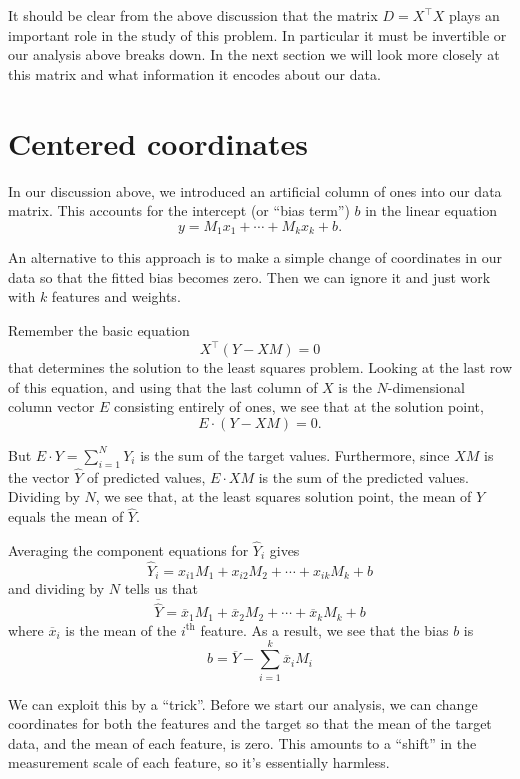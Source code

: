 \documentclass[
  11pt,
  letterpaper,
]{scrbook}
\theoremstyle{plain}
\theoremstyle{remark}
\begin{document}
It should be clear from the above discussion that the matrix
\(D=X^{\intercal}X\) plays an important role in the study of this
problem. In particular it must be invertible or our analysis above
breaks down. In the next section we will look more closely at this
matrix and what information it encodes about our data.

\hypertarget{sec-centered}{%
\section{Centered coordinates}\label{sec-centered}}

In our discussion above, we introduced an artificial column of ones into
our data matrix. This accounts for the intercept (or ``bias term'')
\(b\) in the linear equation \[
y = M_1 x_1 + \cdots + M_k x_k + b.
\]

An alternative to this approach is to make a simple change of
coordinates in our data so that the fitted bias becomes zero. Then we
can ignore it and just work with \(k\) features and weights.

Remember the basic equation \[
X^{\intercal}(Y-XM)=0
\] that determines the solution to the least squares problem. Looking at
the last row of this equation, and using that the last column of \(X\)
is the \(N\)-dimensional column vector \(E\) consisting entirely of
ones, we see that at the solution point, \[
E\cdot (Y-XM)=0.
\]

But \(E\cdot Y=\sum_{i=1}^{N} Y_{i}\) is the sum of the target values.
Furthermore, since \(XM\) is the vector \(\hat{Y}\) of predicted values,
\(E\cdot XM\) is the sum of the predicted values. Dividing by \(N\), we
see that, at the least squares solution point, the mean of \(Y\) equals
the mean of \(\hat{Y}\).

Averaging the component equations for \(\hat{Y}_i\) gives \[
\hat{Y}_{i} = x_{i1}M_1 + x_{i2}M_{2} + \cdots + x_{ik}M_k + b 
\] and dividing by \(N\) tells us that \[
\overline{\hat{Y}} = \overline{x}_{1}M_1 + \overline{x}_{2}M_2 + \cdots + \overline{x}_{k}M_k + b 
\] where \(\overline{x}_{i}\) is the mean of the \(i^{\text{th}}\)
feature. As a result, we see that the bias \(b\) is \[
b=\overline{Y}-\sum_{i=1}^{k}\overline{x}_{i}M_{i}
\]

We can exploit this by a ``trick''. Before we start our analysis, we can
change coordinates for both the features and the target so that the mean
of the target data, and the mean of each feature, is zero. This amounts
to a ``shift'' in the measurement scale of each feature, so it's
essentially harmless.
\end{document}
